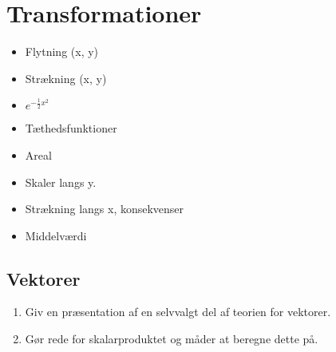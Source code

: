 \documentclass{article}
\begin{document}
\section{Transformationer}
\begin{itemize}
	\item Flytning (x, y)
	\item Strækning (x, y)
	\item $e^{-\frac{1}{2}x^2}$
	\item Tæthedsfunktioner
	\item Areal
	\item Skaler langs y.
	\item Strækning langs x, konsekvenser
	\item Middelværdi
\end{itemize}

\begin{tcolorbox}
	\section{Vektorer}
	\tcblower
	\begin{enumerate}
		\item Giv en præsentation af en selvvalgt del af teorien for vektorer.
		\item Gør rede for skalarproduktet og måder at beregne dette på.
	\end{enumerate}
\end{tcolorbox}
\end{document}
